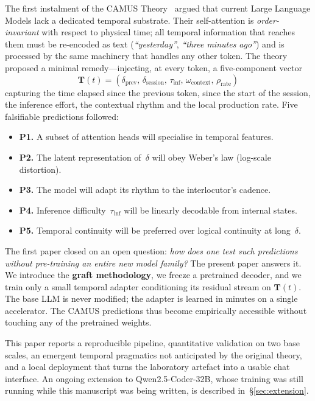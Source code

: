 \documentclass[10pt,twocolumn,letterpaper]{article}
\begin{document}
The first instalment of the CAMUS Theory~\cite{camus2026} argued that current Large Language Models lack a dedicated temporal substrate. Their self-attention is \emph{order-invariant} with respect to physical time; all temporal information that reaches them must be re-encoded as text (\emph{``yesterday''}, \emph{``three minutes ago''}) and is processed by the same machinery that handles any other token. The theory proposed a minimal remedy---injecting, at every token, a five-component vector
\[
\mathbf{T}(t) = (\delta_{\text{prev}},\, \delta_{\text{session}},\, \tau_{\text{inf}},\, \omega_{\text{context}},\, \rho_{\text{rate}})
\]
capturing the time elapsed since the previous token, since the start of the session, the inference effort, the contextual rhythm and the local production rate. Five falsifiable predictions followed:

\begin{itemize}[leftmargin=0.6cm, itemsep=1pt]
    \item \textbf{P1.} A subset of attention heads will specialise in temporal features.
    \item \textbf{P2.} The latent representation of~$\delta$ will obey Weber's law (log-scale distortion).
    \item \textbf{P3.} The model will adapt its rhythm to the interlocutor's cadence.
    \item \textbf{P4.} Inference difficulty~$\tau_{\text{inf}}$ will be linearly decodable from internal states.
    \item \textbf{P5.} Temporal continuity will be preferred over logical continuity at long~$\delta$.
\end{itemize}

The first paper closed on an open question: \emph{how does one test such predictions without pre-training an entire new model family?} The present paper answers it. We introduce the \textbf{graft methodology}, we freeze a pretrained decoder, and we train only a small temporal adapter conditioning its residual stream on $\mathbf{T}(t)$. The base LLM is never modified; the adapter is learned in minutes on a single accelerator. The CAMUS predictions thus become empirically accessible without touching any of the pretrained weights.

This paper reports a reproducible pipeline, quantitative validation on two base scales, an emergent temporal pragmatics not anticipated by the original theory, and a local deployment that turns the laboratory artefact into a usable chat interface. An ongoing extension to Qwen2.5-Coder-32B, whose training was still running while this manuscript was being written, is described in~\S\ref{sec:extension}.
\end{document}
